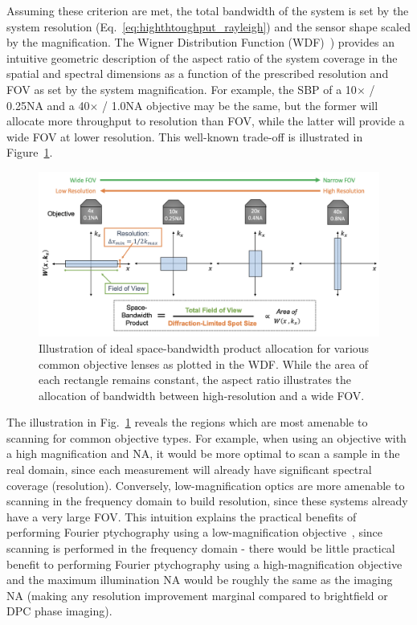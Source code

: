 Assuming these criterion are met, the total bandwidth of the system is set by the system resolution (Eq.~\ref{eq:highthtoughput_rayleigh}) and the sensor shape scaled by the magnification. The Wigner Distribution Function (WDF)~\cite{BASTIAANS197826}) provides an intuitive geometric description of the aspect ratio of the system coverage in the spatial and spectral dimensions as a function of the prescribed resolution and FOV as set by the system magnification. For example, the SBP of a 10$\times$ / 0.25NA and a 40$\times$ / 1.0NA objective may be the same, but the former will allocate more throughput to resolution than FOV, while the latter will provide a wide FOV at lower resolution. This well-known trade-off is illustrated in Figure~\ref{fig:highthroughput_sbp}.

\begin{figure}
  \centering
    \includegraphics[width=\textwidth]{figures/fig_highthroughput_sbp.png}
  \caption{\label{fig:highthroughput_sbp} Illustration of ideal space-bandwidth product allocation for various common objective lenses as plotted in the WDF. While the area of each rectangle remains constant, the aspect ratio illustrates the allocation of bandwidth between high-resolution and a wide FOV.}
\end{figure}

The illustration in Fig.~\ref{fig:highthroughput_sbp} reveals the regions which are most amenable to scanning for common objective types. For example, when using an objective with a high magnification and NA, it would be more optimal to scan a sample in the real domain, since each measurement will already have significant spectral coverage (resolution). Conversely, low-magnification optics are more amenable to scanning in the frequency domain to build resolution, since these systems already have a very large FOV. This intuition explains the practical benefits of performing Fourier ptychography using a low-magnification objective~\cite{Zheng2013}, since scanning is performed in the frequency domain - there would be little practical benefit to performing Fourier ptychography using a high-magnification objective and the maximum illumination NA would be roughly the same as the imaging NA (making any resolution improvement marginal compared to brightfield or DPC phase imaging).

